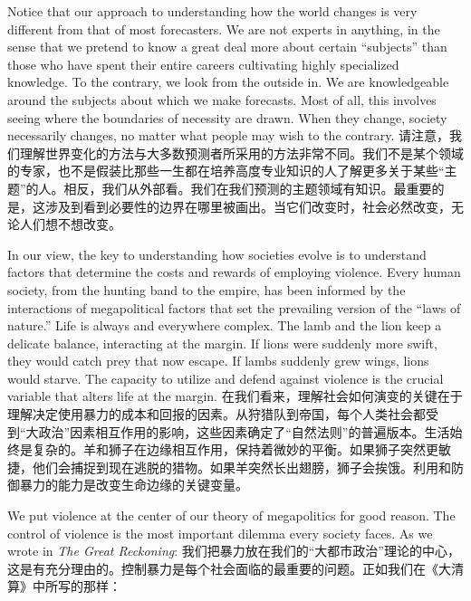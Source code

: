 \begin{Parallel}{97mm}{45mm}
  \ParallelLText
  {Notice that our approach to understanding how the world changes is very different from that of most forecasters. We are not experts in anything, in the sense that we pretend to know a great deal more about certain “subjects” than those who have spent their entire careers cultivating highly specialized knowledge. To the contrary, we look from the outside in. We are knowledgeable around the subjects about which we make forecasts. Most of all, this involves seeing where the boundaries of necessity are drawn. When they change, society necessarily changes, no matter what people may wish to the contrary. }  
  \ParallelRText
  {\small 请注意，我们理解世界变化的方法与大多数预测者所采用的方法非常不同。我们不是某个领域的专家，也不是假装比那些一生都在培养高度专业知识的人了解更多关于某些“主题”的人。相反，我们从外部看。我们在我们预测的主题领域有知识。最重要的是，这涉及到看到必要性的边界在哪里被画出。当它们改变时，社会必然改变，无论人们想不想改变。}
  \ParallelPar


  \ParallelLText
  {In our view, the key to understanding how societies evolve is to understand factors that determine the costs and rewards of employing violence. Every human society, from the hunting band to the empire, has been informed by the interactions of megapolitical factors that set the prevailing version of the “laws of nature.” Life is always and everywhere complex. The lamb and the lion keep a delicate balance, interacting at the margin. If lions were suddenly more swift, they would catch prey that now escape. If lambs suddenly grew wings, lions would starve. The capacity to utilize and defend against violence is the crucial variable that alters life at the margin. }  
  \ParallelRText
  {\small 在我们看来，理解社会如何演变的关键在于理解决定使用暴力的成本和回报的因素。从狩猎队到帝国，每个人类社会都受到“大政治”因素相互作用的影响，这些因素确定了“自然法则”的普遍版本。生活始终是复杂的。羊和狮子在边缘相互作用，保持着微妙的平衡。如果狮子突然更敏捷，他们会捕捉到现在逃脱的猎物。如果羊突然长出翅膀，狮子会挨饿。利用和防御暴力的能力是改变生命边缘的关键变量。}
  \ParallelPar


  \ParallelLText
  {We put violence at the center of our theory of megapolitics for good reason. The control of violence is the most important dilemma every society faces. As we wrote in \emph{The Great Reckoning}:   }  
  \ParallelRText
  {\small 我们把暴力放在我们的“大都市政治”理论的中心，这是有充分理由的。控制暴力是每个社会面临的最重要的问题。正如我们在《大清算》中所写的那样：}
  \ParallelPar



\end{Parallel}
